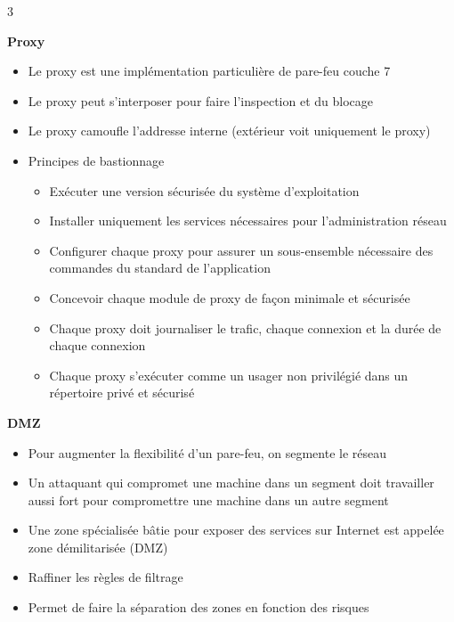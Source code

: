 \documentclass[9pt, a4paper, twoside]{article}
\begin{document}
\begin{multicols}{3}
\begin{flushleft}
    \scriptsize \textbf{Proxy}
\end{flushleft}

\begin{itemize}[label=$\bullet$]
    \item \scriptsize Le proxy est une implémentation particulière de pare-feu couche 7
    \item \scriptsize Le proxy peut s'interposer pour faire l'inspection et du blocage
    \item \scriptsize Le proxy camoufle l'addresse interne (extérieur voit uniquement le proxy)
    \item \scriptsize Principes de bastionnage
    \begin{itemize}[label=$\circ$]
        \item \scriptsize Exécuter une version sécurisée du système d'exploitation
        \item \scriptsize Installer uniquement les services nécessaires pour l'administration réseau
        \item \scriptsize Configurer chaque proxy pour assurer un sous-ensemble nécessaire des commandes du standard de l'application
        \item \scriptsize Concevoir chaque module de proxy de façon minimale et sécurisée
        \item \scriptsize Chaque proxy doit journaliser le trafic, chaque connexion et la durée de chaque connexion
        \item \scriptsize Chaque proxy s'exécuter comme un usager non privilégié dans un répertoire privé et sécurisé
    \end{itemize}
\end{itemize}

\begin{flushleft}
    \scriptsize \textbf{DMZ}
\end{flushleft}

\begin{itemize}[label=$\bullet$]
    \item \scriptsize Pour augmenter la flexibilité d'un pare-feu, on segmente le réseau
    \item \scriptsize Un attaquant qui compromet une machine dans un segment doit travailler aussi fort pour compromettre une machine dans un autre segment
    \item \scriptsize Une zone spécialisée bâtie pour exposer des services sur Internet est appelée zone démilitarisée (DMZ)
    \item \scriptsize Raffiner les règles de filtrage
    \item \scriptsize Permet de faire la séparation des zones en fonction des risques
\end{itemize}


\end{multicols}
\end{document}
